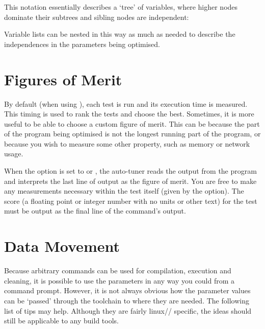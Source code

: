 \documentclass[a4paper, draft]{article}
\begin{document}
This notation essentially describes a `tree' of 
variables, where higher nodes dominate their subtrees and sibling nodes are 
independent:
\treeDrawABCDEF

Variable lists can be nested in this way as much as needed to describe 
the independences in the parameters being optimised.





\section{Figures of Merit}
\label{sec:custom-fom}
By default (when using ), each test is run and 
its execution time is measured. This timing is used to rank the tests and 
choose the best. Sometimes, it is more useful to be able to choose a custom 
figure of merit. This can be because the part of the program being optimised 
is not the longest running part of the program, or because you wish to measure 
some other property, such as memory or network usage.

When the  option is set to  or 
, the auto-tuner reads the output from the program and 
interprets the last line of output as the figure of merit. 
You are free to make any measurements necessary within the test itself 
(given by the  option). The score (a floating point or 
integer number with no units or other text) for the test must be output as 
the final line of the command's output.










\clearpage

\section{Data Movement}
Because arbitrary commands can be used for compilation, execution and cleaning, 
it is possible to use the parameters in any way you could from a command 
prompt. However, it is not always obvious how the parameter values can be 
`passed' through the toolchain to where they are needed. The following list of 
tips may help. Although they are fairly linux// 
specific, the ideas should still be applicable to any build tools.

\end{document}
